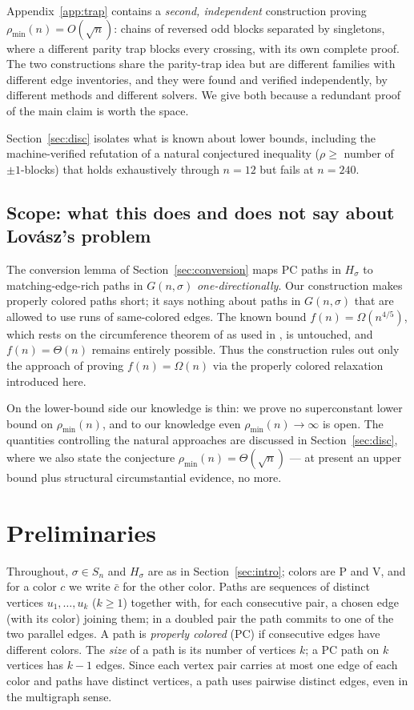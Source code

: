\documentclass[11pt]{article}
\theoremstyle{definition}
\newcommand{\pmin}{\rho_{\min}}
\begin{document}
Appendix~\ref{app:trap} contains a \emph{second, independent} construction proving
$\pmin(n) = O(\sqrt n)$: chains of reversed odd blocks separated by singletons, where a
different parity trap blocks every crossing, with its own complete proof. The two
constructions share the parity-trap idea but are different families with different edge
inventories, and they were found and verified independently, by different methods and
different solvers. We give both because a redundant proof of the main claim is worth
the space.

Section~\ref{sec:disc} isolates what is known about lower bounds, including the
machine-verified refutation of a natural conjectured inequality
($\rho \ge$ number of $\pm1$-blocks) that holds exhaustively through $n = 12$ but fails
at $n = 240$.

\subsection{Scope: what this does and does not say about Lov\'asz's
problem}\label{subsec:scope}

The conversion lemma of Section~\ref{sec:conversion} maps PC paths in $H_\sigma$ to
matching-edge-rich paths in $G(n,\sigma)$ \emph{one-directionally}. Our construction
makes properly colored paths short; it says nothing about paths in $G(n,\sigma)$ that
are allowed to use runs of same-colored edges. The known bound
$f(n) = \Omega(n^{4/5})$, which rests on the circumference theorem of \cite{LYZ18} as
used in \cite{NSTW25}, is untouched, and $f(n) = \Theta(n)$ remains entirely possible.
Thus the construction rules out only the approach of proving $f(n) = \Omega(n)$ via the
properly colored relaxation introduced here.

On the lower-bound side our knowledge is thin: we prove no superconstant lower bound on
$\pmin(n)$, and to our knowledge even $\pmin(n) \to \infty$ is open. The quantities
controlling the natural approaches are discussed in Section~\ref{sec:disc}, where we
also state the conjecture $\pmin(n) = \Theta(\sqrt n)$ --- at present an upper bound
plus structural circumstantial evidence, no more.

\section{Preliminaries}\label{sec:prelim}

Throughout, $\sigma \in S_n$ and $H_\sigma$ are as in Section~\ref{sec:intro}; colors
are $\mathrm P$ and $\mathrm V$, and for a color $c$ we write $\bar c$ for the other
color. Paths are sequences of distinct vertices $u_1,\dots,u_k$ ($k \ge 1$) together
with, for each consecutive pair, a chosen edge (with its color) joining them; in a
doubled pair the path commits to one of the two parallel edges. A path is
\emph{properly colored} (PC) if consecutive edges have different colors. The
\emph{size} of a path is its number of vertices $k$; a PC path on $k$ vertices has
$k-1$ edges. Since each vertex pair carries at most one edge of each color and paths
have distinct vertices, a path uses pairwise distinct edges, even in the multigraph
sense.
\end{document}
